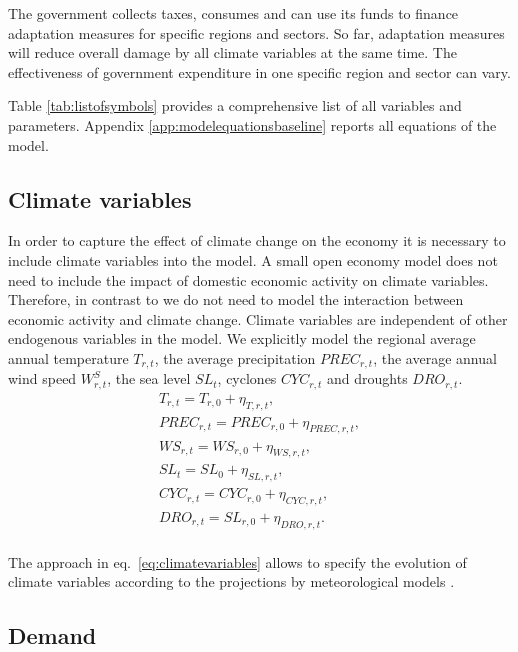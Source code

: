 \documentclass[10pt,a4paper]{article}
\begin{document}
The government collects taxes, consumes and can use its funds to finance adaptation measures for specific regions and sectors. So far, adaptation measures will reduce overall damage by all climate variables at the same time. The effectiveness of government expenditure in one specific region and sector can vary.


Table \ref{tab:listofsymbols} provides a comprehensive list of all variables and parameters. Appendix \ref{app:modelequationsbaseline} reports all equations of the model.

\subsection{Climate variables}
In order to capture the effect of climate change on the economy it is necessary to include climate variables into the model. A small open economy model does not need to include the impact of domestic economic activity on climate variables. Therefore, in contrast to \cite{nordhaus1993optimal} we do not need to model the interaction between economic activity and climate change. Climate variables are independent of other endogenous variables in the model. We explicitly model the regional average annual temperature $T_{r,t}$, the average precipitation $PREC_{r,t}$, the average annual wind speed $W^S_{r,t}$, the sea level $SL_{t}$, cyclones $CYC_{r,t}$ and droughts $DRO_{r,t}$. 
\begin{align}\label{eq:climatevariables}
T_{r,t} = T_{r,0} + \eta_{T,r,t}, \nonumber \\
PREC_{r,t} = PREC_{r,0} + \eta_{PREC,r,t}, \nonumber \\
WS_{r,t} = WS_{r,0} + \eta_{WS,r,t}, \nonumber \\
SL_{t} = SL_{0} + \eta_{SL,r,t}, \nonumber \\
CYC_{r,t} = CYC_{r,0} + \eta_{CYC,r,t}, \nonumber \\
DRO_{r,t} = SL_{r,0} + \eta_{DRO,r,t}. \nonumber \\
\end{align}

The approach in eq.~\ref{eq:climatevariables} allows to specify the evolution of climate variables according to the projections by meteorological models \citep[e.g.][]{stocker2013climate}.

\subsection{Demand}
\end{document}
